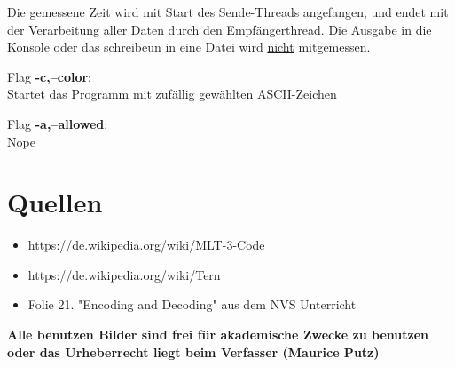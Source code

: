 \documentclass{article}
\begin{document}
Die gemessene Zeit wird mit Start des Sende-Threads angefangen, und endet mit der Verarbeitung aller Daten durch den Empfängerthread. Die Ausgabe in die Konsole oder
das schreibeun in eine Datei wird \underline{nicht} mitgemessen.

Flag \textbf{-c,--color}:\\
Startet das Programm mit zufällig gewählten ASCII-Zeichen

Flag \textbf{-a,--allowed}:\\
Nope



\section{Quellen}

\begin{itemize}
	\item https://de.wikipedia.org/wiki/MLT-3-Code
	\item https://de.wikipedia.org/wiki/Tern%
	\item Folie 21. "Encoding and Decoding" aus dem NVS Unterricht
\end{itemize}

\textbf{Alle benutzen Bilder sind frei für akademische Zwecke zu benutzen oder das Urheberrecht liegt beim Verfasser (Maurice Putz)}
\end{document}
